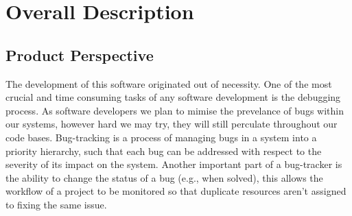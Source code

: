 \documentclass{article}
\newcommand{\comment}[1]{}
\begin{document}
\section{Overall Description}
\subsection{Product Perspective}
\comment{
Describe the context and origin of the product being specified in this \acrshort{srs}. For example, state whether this product is a follow-on member of a product family, a replacment for existing systems, or a new, self-contained product. If the \acrshort{srs} defines a component of a larger system, relate the requirments of the larger system to the functionality of this software and identift interfaces between the two. A simple diagram that shows the major components of the overall system, subsystem interconnections, and external interfaces can be helpful.
}
The development of this software originated out of necessity. One of the most crucial and time consuming tasks of any software development is the \gls{debugging} process. As software developers we plan to mimise the prevelance of bugs within our systems, however hard we may try, they will still perculate throughout our code bases. Bug-tracking is a process of managing bugs in a system into a priority hierarchy, such that each bug can be addressed with respect to the severity of its impact on the system. Another important part of a bug-tracker is the ability to change the status of a bug (e.g., when solved), this allows the workflow of a project to be monitored so that duplicate resources aren't assigned to fixing the same issue.
\end{document}
